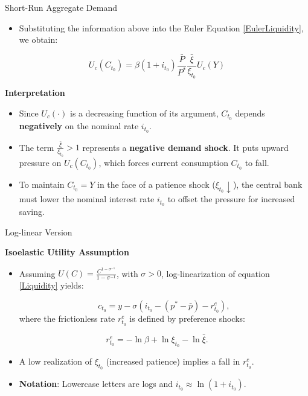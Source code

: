 \documentclass[11pt,aspectratio=169]{beamer}
\begin{document}
\begin{frame}{Short-Run Aggregate Demand}
\small
\begin{itemize}
    \item Substituting the information above into the Euler Equation \eqref{EulerLiquidity}, we obtain:
\end{itemize}

\begin{equation}
U_{c}(C_{t_{0}}) = \beta (1+i_{t_{0}}) \frac{\bar{P}}{P^{\ast}} \frac{\bar{\xi}}{\xi_{t_{0}}} U_{c}(Y)
\label{Liquidity}
\end{equation}

\textbf{Interpretation}
\begin{itemize}
    \item Since $U_c(\cdot)$ is a decreasing function of its argument, $C_{t_0}$ depends \textbf{negatively} on the nominal rate $i_{t_0}$.
    \item The term $\frac{\bar{\xi}}{\xi_{t_0}} > 1$ represents a \textbf{negative demand shock}. It puts upward pressure on $U_c(C_{t_0})$, which forces current consumption $C_{t_0}$ to fall.
    \item To maintain $C_{t_0} = Y$ in the face of a patience shock ($\xi_{t_0} \downarrow$), the central bank  must lower the nominal interest rate $i_{t_0}$ to offset the pressure for increased saving.
\end{itemize}
\end{frame}
\begin{frame}{Log-linear Version}
\small

\textbf{Isoelastic Utility Assumption}
\begin{itemize}
    \item Assuming $U(C) = \frac{C^{1-\sigma^{-1}}}{1-\sigma^{-1}}$, with $\sigma >0$, log-linearization of equation \eqref{Liquidity} yields:

\begin{equation}
c_{t_{0}} = y - \sigma \left(i_{t_{0}} - (p^{\ast} - \bar{p}) - r_{t_{0}}^{e} \right),
\label{Wicksell2}
\end{equation}
where the frictionless rate $r_{t_{0}}^{e}$ is defined by preference shocks:
\end{itemize}

\begin{equation*}
r_{t_{0}}^{e} = -\ln \beta + \ln \xi_{t_{0}} - \ln \bar{\xi}.
\end{equation*}
\vspace{0.2cm}
\begin{itemize}
    \item A low realization of $\xi_{t_{0}}$ (increased patience) implies a fall in $r_{t_{0}}^{e}$.
    \item \textbf{Notation}: Lowercase letters are logs and $i_{t_0} \approx \ln(1+i_{t_0})$.
\end{itemize}

\end{frame}
\end{document}
